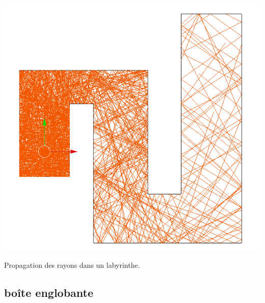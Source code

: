 \begin{figureth}
		\includegraphics[width=0.5\linewidth]{images/test0}
		\caption{Propagation des rayons dans un labyrinthe.}
		\label{test0}
\end{figureth}		

\subsection{boîte englobante}

